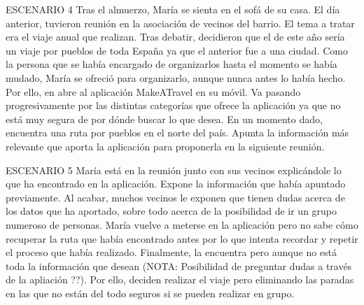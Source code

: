 \documentclass[11pt]{article}
\begin{document}
ESCENARIO 4
Tras el almuerzo, María se sienta en el sofá de su casa. El día anterior, tuvieron reunión en la asociación de vecinos del barrio. El tema a tratar era el viaje anual que realizan. Tras debatir, decidieron que el de este año sería un viaje por pueblos de toda España ya que el anterior fue a una ciudad. Como la persona que se había encargado de organizarlos hasta el momento se había mudado, María se ofreció para organizarlo, aunque nunca antes lo había hecho. Por ello, en abre al aplicación MakeATravel en su móvil. Va pasando progresivamente por las distintas categorías que ofrece la aplicación ya que no está muy segura de por dónde buscar lo que desea. En un momento dado, encuentra una ruta por pueblos en el norte del país. Apunta la información más relevante que aporta la aplicación para proponerla en la siguiente reunión. 

ESCENARIO 5
María está en la reunión junto con sus vecinos explicándole lo que ha encontrado en la aplicación. Expone la información que había apuntado previamente. Al acabar, muchos vecinos le exponen que tienen dudas acerca de los datos que ha aportado, sobre todo acerca de la posibilidad de ir un grupo numeroso de personas. María vuelve a meterse en la aplicación pero no sabe cómo recuperar la ruta que había encontrado antes por lo que intenta recordar y repetir el proceso que había realizado. Finalmente, la encuentra pero aunque no está toda la información que desean (NOTA: Posibilidad de preguntar dudas a través de la apliación ??). Por ello, deciden realizar el viaje pero eliminando las paradas en las que no están del todo seguros si se pueden realizar en grupo.
\end{document}
